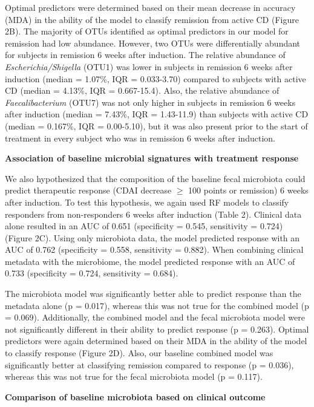 \documentclass[12pt,]{article}
\begin{document}
Optimal predictors were determined based on their mean decrease in
accuracy (MDA) in the ability of the model to classify remission from
active CD (Figure 2B). The majority of OTUs identified as optimal
predictors in our model for remission had low abundance. However, two
OTUs were differentially abundant for subjects in remission 6 weeks
after induction. The relative abundance of \emph{Escherichia/Shigella}
(OTU1) was lower in subjects in remission 6 weeks after induction
(median = 1.07\%, IQR = 0.033-3.70) compared to subjects with active CD
(median = 4.13\%, IQR = 0.667-15.4). Also, the relative abundance of
\emph{Faecalibacterium} (OTU7) was not only higher in subjects in
remission 6 weeks after induction (median = 7.43\%, IQR = 1.43-11.9)
than subjects with active CD (median = 0.167\%, IQR = 0.00-5.10), but it
was also present prior to the start of treatment in every subject who
was in remission 6 weeks after induction.

\textbf{Association of baseline microbial signatures with treatment
response}

We also hypothesized that the composition of the baseline fecal
microbiota could predict therapeutic response (CDAI decrease \({\geq}\)
100 points or remission) 6 weeks after induction. To test this
hypothesis, we again used RF models to classify responders from
non-responders 6 weeks after induction (Table 2). Clinical data alone
resulted in an AUC of 0.651 (specificity = 0.545, sensitivity = 0.724)
(Figure 2C). Using only microbiota data, the model predicted response
with an AUC of 0.762 (specificity = 0.558, sensitivity = 0.882). When
combining clinical metadata with the microbiome, the model predicted
response with an AUC of 0.733 (specificity = 0.724, sensitivity =
0.684).

The microbiota model was significantly better able to predict response
than the metadata alone (p = 0.017), whereas this was not true for the
combined model (p = 0.069). Additionally, the combined model and the
fecal microbiota model were not significantly different in their ability
to predict response (p = 0.263). Optimal predictors were again
determined based on their MDA in the ability of the model to classify
response (Figure 2D). Also, our baseline combined model was
significantly better at classifying remission compared to response (p =
0.036), whereas this was not true for the fecal microbiota model (p =
0.117).

\textbf{Comparison of baseline microbiota based on clinical outcome}
\end{document}
